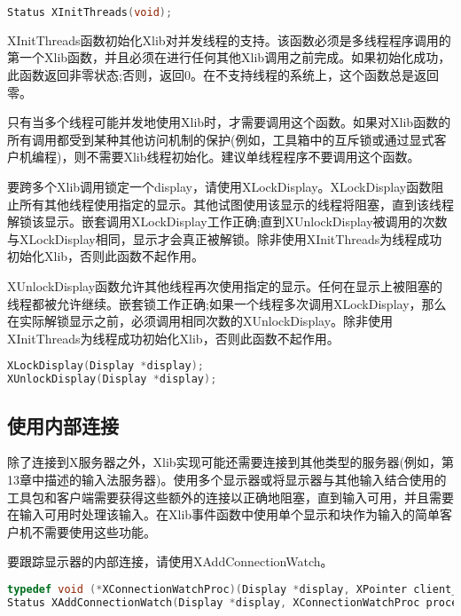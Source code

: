 \begin{lstlisting}[language=C]
Status XInitThreads(void);
\end{lstlisting}

XInitThreads函数初始化Xlib对并发线程的支持。该函数必须是多线程程序调用的第一个Xlib函数，并且必须在进行任何其他Xlib调用之前完成。如果初始化成功，此函数返回非零状态;否则，返回0。在不支持线程的系统上，这个函数总是返回零。

只有当多个线程可能并发地使用Xlib时，才需要调用这个函数。如果对Xlib函数的所有调用都受到某种其他访问机制的保护(例如，工具箱中的互斥锁或通过显式客户机编程)，则不需要Xlib线程初始化。建议单线程程序不要调用这个函数。

要跨多个Xlib调用锁定一个display，请使用XLockDisplay。XLockDisplay函数阻止所有其他线程使用指定的显示。其他试图使用该显示的线程将阻塞，直到该线程解锁该显示。嵌套调用XLockDisplay工作正确;直到XUnlockDisplay被调用的次数与XLockDisplay相同，显示才会真正被解锁。除非使用XInitThreads为线程成功初始化Xlib，否则此函数不起作用。

XUnlockDisplay函数允许其他线程再次使用指定的显示。任何在显示上被阻塞的线程都被允许继续。嵌套锁工作正确;如果一个线程多次调用XLockDisplay，那么在实际解锁显示之前，必须调用相同次数的XUnlockDisplay。除非使用XInitThreads为线程成功初始化Xlib，否则此函数不起作用。

\begin{lstlisting}[language=C]
XLockDisplay(Display *display);
XUnlockDisplay(Display *display);
\end{lstlisting}

\subsection{使用内部连接}

除了连接到X服务器之外，Xlib实现可能还需要连接到其他类型的服务器(例如，第13章中描述的输入法服务器)。使用多个显示器或将显示器与其他输入结合使用的工具包和客户端需要获得这些额外的连接以正确地阻塞，直到输入可用，并且需要在输入可用时处理该输入。在Xlib事件函数中使用单个显示和块作为输入的简单客户机不需要使用这些功能。

\noindent 要跟踪显示器的内部连接，请使用XAddConnectionWatch。

\begin{lstlisting}[language=C]
typedef void (*XConnectionWatchProc)(Display *display, XPointer client_data, int fd, Bool opening, XPointer *watch_data);
Status XAddConnectionWatch(Display *display, XConnectionWatchProc procedure, XPointer client_data);
\end{lstlisting}

